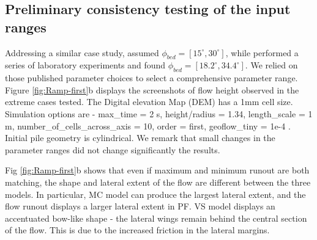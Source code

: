 \documentclass{article}
\begin{document}
\subsection{Preliminary consistency testing of the input ranges}\label{consistency}
Addressing a similar case study, \citep{Dalbey2008} assumed $\phi_{bed}=[15^\mathrm{\circ}, 30^\mathrm{\circ}]$, while \citep{WebbBursik2016} performed a series of laboratory experiments and found $\phi_{bed}=[18.2^\mathrm{\circ}, 34.4^\mathrm{\circ}]$. We relied on those published parameter choices to select a comprehensive parameter range. Figure \ref{fig:Ramp-first}b displays the screenshots of flow height observed in the extreme cases tested. The Digital elevation Map (DEM) has a 1mm cell size. Simulation options are - max\_time = 2 s, height/radius = 1.34, length\_scale = 1 m, number\_of\_cells\_across\_axis = 10, order = first, geoflow\_tiny = 1e-4 \citep{Patra2005,Aghakhani2016}. Initial pile geometry is cylindrical. We remark that small changes in the parameter ranges did not change significantly the results.


Fig \ref{fig:Ramp-first}b shows that even if maximum and minimum runout are both matching, the shape and lateral extent of the flow are different between the three models. In particular, MC model can produce the largest lateral extent, and the flow runout displays a larger lateral extent in PF. VS model displays an accentuated bow-like shape - the lateral wings remain behind the central section of the flow. This is due to the increased friction in the lateral margins.
\end{document}
